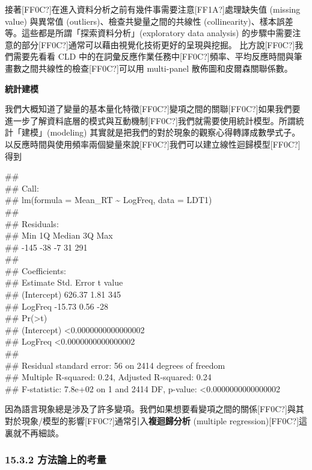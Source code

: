 接著[FF0C?]在進入資料分析之前有幾件事需要注意[FF1A?]處理缺失值 (missing value) 與異常值 (outliers)、檢查共變量之間的共線性 (collinearity)、樣本誤差等。這些都是所謂「探索資料分析」(exploratory data analysis) 的步驟中需要注意的部分[FF0C?]通常可以藉由視覺化技術更好的呈現與挖掘。 比方說[FF0C?]我們需要先看看 CLD 中的在詞彙反應作業任務中[FF0C?]頻率、平均反應時間與筆畫數之間共線性的檢查[FF0C?]可以用 multi-panel 散佈圖和皮爾森關聯係數。

\textbf{統計建模}

我們大概知道了變量的基本量化特徵[FF0C?]變項之間的關聯[FF0C?]如果我們要進一步了解資料底層的模式與互動機制[FF0C?]我們就需要使用統計模型。所謂統計「建模」(modeling) 其實就是把我們的對於現象的觀察心得轉譯成數學式子。以反應時間與使用頻率兩個變量來說[FF0C?]我們可以建立線性迴歸模型[FF0C?]得到

\#\# \\
\#\# Call:\\
\#\# lm(formula = Mean\_RT {\textasciitilde} LogFreq, data = LDT1)\\
\#\# \\
\#\# Residuals:\\
\#\#    Min     1Q Median     3Q    Max \\
\#\#   {}-145    {}-38     {}-7     31    291 \\
\#\# \\
\#\# Coefficients:\\
\#\#             Estimate Std. Error t value\\
\#\# (Intercept)   626.37       1.81     345\\
\#\# LogFreq       {}-15.73       0.56     {}-28\\
\#\#                        Pr(>{\textbar}t{\textbar})\\
\#\# (Intercept) <0.0000000000000002\\
\#\# LogFreq     <0.0000000000000002\\
\#\# \\
\#\# Residual standard error: 56 on 2414 degrees of freedom\\
\#\# Multiple R-squared:  0.24,   Adjusted R-squared:  0.24 \\
\#\# F-statistic: 7.8e+02 on 1 and 2414 DF,  p-value: <0.0000000000000002

因為語言現象總是涉及了許多變項。我們如果想要看變項之間的關係[FF0C?]與其對於現象/模型的影響[FF0C?]通常引入\textbf{複迴歸分析} (multiple regression)[FF0C?]這裏就不再細談。

\subsubsection{15.3.2 方法論上的考量}

